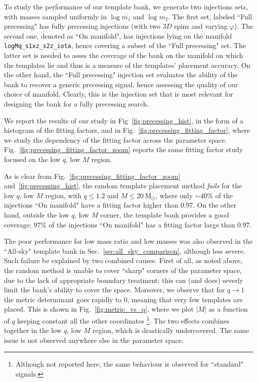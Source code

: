 \documentclass[twocolumn,showpacs,preprintnumbers,nofootinbib,prd,
superscriptaddress,10pt]{revtex4-2}
\begin{document}
To study the performance of our template bank, we generate two injections sets, with masses sampled uniformly in $\log m_1$ and $\log m_2$.
The first set, labeled ``Full precessing" has fully precessing injections (with two $3D$ spins and varying $\varphi$). The second one, denoted as ``On manifold", has injections lying on the manifold \texttt{logMq\_s1xz\_s2z\_iota}, hence covering a subset of the ``Full precessing" set.
The latter set is needed to asses the coverage of the bank on the manifold on which the templates lie and thus is a measure of the templates' placement accuracy.
On the other hand, the ``Full precessing" injection set evaluates the ability of the bank to recover a generic precessing signal, hence assessing the quality of our choice of manifold.
Clearly, this is the injection set that is most relevant for designing the bank for a fully precessing search.

We report the results of our study in Fig~\ref{fig:precessing_hist}, in the form of a histogram of the fitting factors, and in Fig.~\ref{fig:precessing_fitting_factor}, where we study the dependency of the fitting factor across the parameter space.
Fig.~\ref{fig:precessing_fitting_factor_zoom} reports the same fitting factor study focused on the low $q$, low $M$ region.

As is clear from Fig.~\ref{fig:precessing_fitting_factor_zoom} and~\ref{fig:precessing_hist}, the random template placement method {\it fails} for the low $q$, low $M$ region, with $q \leq 1.2$ and $M \leq \SI{20}{\mathrm{M_\odot}}$, where only $\sim 40\%$ of the injections ``On manifold" have a fitting factor higher than $0.97$.
On the other hand, outside the low $q$, low $M$ corner, the template bank provides a good coverage: $97\%$ of the injections ``On manifold" has a fitting factor large than $0.97$.

The poor performance for low mass ratio and low masses was also observed in the ``All-sky" template bank in Sec.~\ref{sec:all_sky_comparison}, although less severe.
Such failure be explained by two combined causes.
First of all, as noted above, the random method is unable to cover ``sharp" corners of the parameter space, due to the lack of appropriate boundary treatment: this can (and does) severly limit the bank's ability to cover the space.
Moreover, we observe that for $q \to 1$ the metric determinant goes rapidly to $0$, meaning that very few templates are placed.  This is shown in Fig.~\ref{fig:metric_vs_q}, where we plot $|M|$ as a function of $q$ keeping constant all the other coordinates \footnote{Although not reported here, the same behaviour is observed for ``standard" signals.}.
The two effects combines together in the low $q$, low $M$ region, which is drastically undercovered. The same issue is not observed anywhere else in the parameter space.
\end{document}
